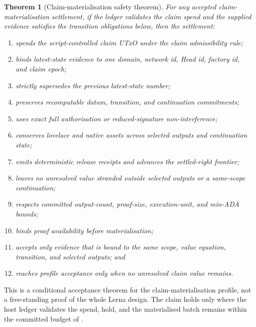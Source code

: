 \documentclass[a4paper,11pt]{article}
\theoremstyle{definition}
\theoremstyle{plain}
\newtheorem{theorem}[definition]{Theorem}
\theoremstyle{remark}
\begin{document}
\begin{theorem}[Claim-materialisation safety theorem]
\label{thm:claim-materialisation-safety}
For any accepted claim-materialisation settlement, if the ledger validates the
claim spend and the supplied evidence satisfies the transition obligations
below, then the settlement:
\begin{enumerate}[leftmargin=1.2cm]
\item spends the script-controlled claim UTxO under the claim admissibility
rule;
\item binds latest-state evidence to one domain, network id, Head id, factory
id, and claim epoch;
\item strictly supersedes the previous latest-state number;
\item preserves recomputable datum, transition, and continuation commitments;
\item uses exact full authorisation or reduced-signature non-interference;
\item conserves lovelace and native assets across selected outputs and
continuation state;
\item emits deterministic release receipts and advances the settled-right
frontier;
\item leaves no unresolved value stranded outside selected outputs or a
same-scope continuation;
\item respects committed output-count, proof-size, execution-unit, and min-ADA
bounds;
\item binds proof availability before materialisation;
\item accepts only evidence that is bound to the same scope, value equation,
transition, and selected outputs; and
\item reaches profile acceptance only when no unresolved claim value remains.
\end{enumerate}
\end{theorem}

This is a conditional acceptance theorem for the claim-materialisation profile,
not a free-standing proof of the whole Lerna design. The claim holds only where
the host ledger validates the spend, 
hold, and the materialised batch remains within the committed budget of
.
\end{document}
